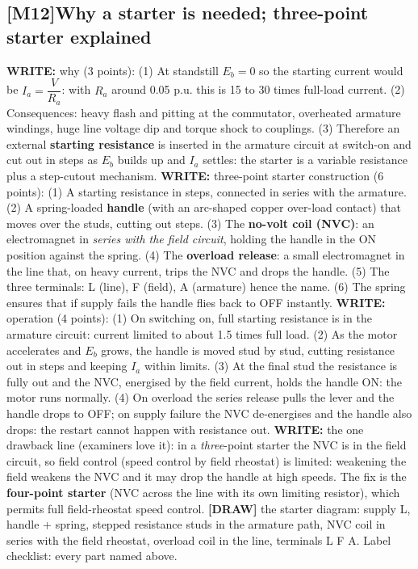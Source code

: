 \documentclass[11pt]{article}
\newcommand{\q}[2]{\subsection*{\color{copper}#1\quad\color{iron}#2}}
\newcommand{\w}[1]{\textbf{\color{copper}WRITE:} #1}
\newcommand{\dw}[1]{\textbf{\color{muted}[DRAW]} #1}
\begin{document}
\q{[M12]}{Why a starter is needed; three-point starter explained}
\w{why (3 points):} (1) At standstill $E_b = 0$ so the starting current would be $I_a = \dfrac{V}{R_a}$: with $R_a$ around 0.05 p.u. this is 15 to 30 times full-load current. (2) Consequences: heavy flash and pitting at the commutator, overheated armature windings, huge line voltage dip and torque shock to couplings. (3) Therefore an external \textbf{starting resistance} is inserted in the armature circuit at switch-on and cut out in steps as $E_b$ builds up and $I_a$ settles: the starter is a variable resistance plus a step-cutout mechanism.
\w{three-point starter construction (6 points):} (1) A starting resistance in steps, connected in series with the armature. (2) A spring-loaded \textbf{handle} (with an arc-shaped copper over-load contact) that moves over the studs, cutting out steps. (3) The \textbf{no-volt coil (NVC)}: an electromagnet in \emph{series with the field circuit}, holding the handle in the ON position against the spring. (4) The \textbf{overload release}: a small electromagnet in the line that, on heavy current, trips the NVC and drops the handle. (5) The three terminals: L (line), F (field), A (armature) hence the name. (6) The spring ensures that if supply fails the handle flies back to OFF instantly.
\w{operation (4 points):} (1) On switching on, full starting resistance is in the armature circuit: current limited to about 1.5 times full load. (2) As the motor accelerates and $E_b$ grows, the handle is moved stud by stud, cutting resistance out in steps and keeping $I_a$ within limits. (3) At the final stud the resistance is fully out and the NVC, energised by the field current, holds the handle ON: the motor runs normally. (4) On overload the series release pulls the lever and the handle drops to OFF; on supply failure the NVC de-energises and the handle also drops: the restart cannot happen with resistance out.
\w{the one drawback line (examiners love it):} in a \emph{three}-point starter the NVC is in the field circuit, so field control (speed control by field rheostat) is limited: weakening the field weakens the NVC and it may drop the handle at high speeds. The fix is the \textbf{four-point starter} (NVC across the line with its own limiting resistor), which permits full field-rheostat speed control.
\dw{the starter diagram: supply L, handle + spring, stepped resistance studs in the armature path, NVC coil in series with the field rheostat, overload coil in the line, terminals L F A. Label checklist: every part named above.}
\end{document}

